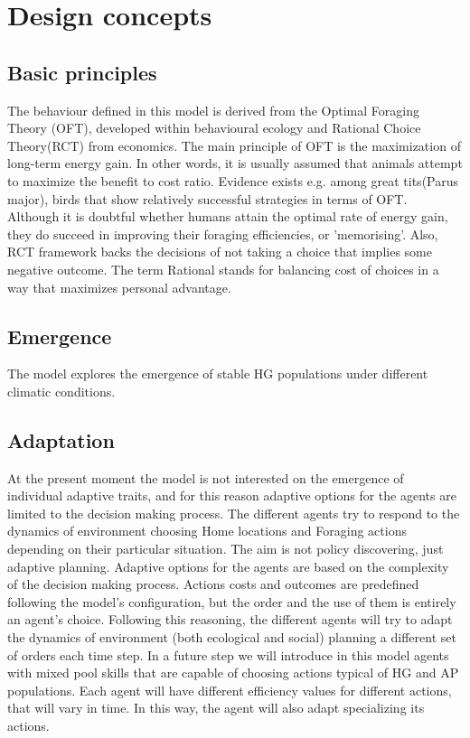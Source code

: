 \documentclass[11pt,oneside,a4paper,openright]{report}
\begin{document}
\section{Design concepts}

\subsection{Basic principles}
The behaviour defined in this model is derived from the Optimal Foraging Theory (OFT)\cite{Holling1973}, developed
within behavioural ecology and Rational Choice Theory(RCT)\cite{Scott2000} from economics. The main principle of OFT is the maximization of long-term energy gain. In other words, it is usually assumed that animals attempt to maximize the benefit to cost ratio. Evidence exists e.g. among great tits(Parus major), birds that show relatively successful strategies in terms of OFT. Although it is doubtful whether humans attain the optimal rate of energy gain, they do succeed in improving their foraging efficiencies, or 'memorising'. Also, RCT framework backs the decisions of not taking a choice that implies some negative outcome. The term Rational stands for balancing cost of choices in a way that maximizes personal advantage.


\subsection{Emergence}
The model explores the emergence of stable HG populations under different climatic conditions.




\subsection{Adaptation}
\label{sec:Adaptation}
At the present moment the model is not interested on the emergence of individual adaptive traits, and
for this reason adaptive options for the agents are limited to the decision making process. The different
agents try to respond to the dynamics of environment choosing Home locations and Foraging actions
depending on their particular situation. The aim is not policy discovering, just adaptive planning.
Adaptive options for the agents are based on the complexity of the decision making process. Actions
costs and outcomes are predefined following the model's configuration, but the order and the use of
them is entirely an agent's choice. Following this reasoning, the different agents will try to adapt the
dynamics of environment (both ecological and social) planning a different set of orders each time step.
In a future step we will introduce in this model agents with mixed pool skills that are capable of choosing actions typical of HG and AP populations. Each agent will have different efficiency values for different actions, that will vary in time. In this way, the agent will also adapt specializing its actions.
\end{document}
